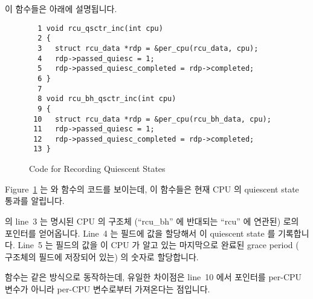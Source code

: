 이 함수들은 아래에 설명됩니다.
\iffalse

Each of these functions is described below.
\fi

\begin{figure}[tbp]
{ \scriptsize
\begin{verbatim}
  1 void rcu_qsctr_inc(int cpu)
  2 {
  3   struct rcu_data *rdp = &per_cpu(rcu_data, cpu);
  4   rdp->passed_quiesc = 1;
  5   rdp->passed_quiesc_completed = rdp->completed;
  6 }
  7
  8 void rcu_bh_qsctr_inc(int cpu)
  9 {
 10   struct rcu_data *rdp = &per_cpu(rcu_bh_data, cpu);
 11   rdp->passed_quiesc = 1;
 12   rdp->passed_quiesc_completed = rdp->completed;
 13 }
\end{verbatim}
}
\caption{Code for Recording Quiescent States}
\label{fig:app:rcuimpl:rcutreewt:Code for Recording Quiescent States}
\end{figure}

Figure~\ref{fig:app:rcuimpl:rcutreewt:Code for Recording Quiescent States}
는  와  함수의 코드를 보이는데, 이
함수들은 현재 CPU 의 quiescent state 통과를 알립니다.

 의 line~3 는 명시된 CPU 의  구조체
(``rcu\_bh'' 에 반대되는 ``rcu'' 에 연관된) 로의 포인터를 얻어옵니다.
Line~4 는  필드에 값을 할당해서 이 quiescent state 를
기록합니다.
Line~5 는  필드의 값을 이 CPU 가 알고 있는
마지막으로 완료된 grace period ( 구조체의  필드에
저장되어 있는) 의 숫자로 할당합니다.
\iffalse

Figure~\ref{fig:app:rcuimpl:rcutreewt:Code for Recording Quiescent States}
shows the code for \co{rcu_qsctr_inc()} and \co{rcu_bh_qsctr_inc()},
which note the current CPU's passage through a quiescent state.

Line~3 of \co{rcu_qsctr_inc()} obtains a pointer to the specified
CPU's \co{rcu_data} structure (which corresponds to ``rcu'' as opposed
to ``rcu\_bh'').
Line~4 sets the \co{->passed_quiesc} field, recording the
quiescent state.
Line~5 sets the \co{->passed_quiesc_completed} field to the number
of the last completed grace period that this CPU knows of (which is
stored in the \co{->completed} field of the \co{rcu_data}
structure).
\fi

 함수는 같은 방식으로 동작하는데, 유일한 차이점은
line~10 에서  포인터를  per-CPU 변수가 아니라
 per-CPU 변수로부터 가져온다는 점입니다.
\iffalse

